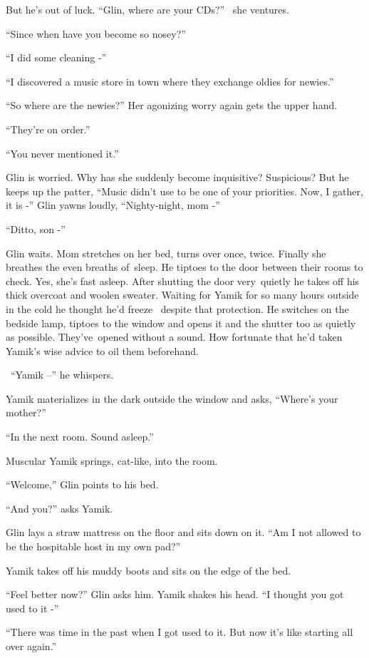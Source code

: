 \documentclass[twoside,11pt]{book}
\begin{document}
But he's out of luck. ``Glin, where are your CDs?'' \ she ventures.

``Since when have you become so nosey?''

``I did some cleaning -''

``I discovered a music store in town where they exchange oldies for newies.''

``So where are the newies?'' Her agonizing worry again gets the upper hand.

``They're on order.''

``You never mentioned it.''

Glin is worried. Why has she suddenly become inquisitive? Suspicious? But he keeps up the patter, ``Music
didn't use to be one of your priorities. Now, I gather, it is -'' Glin yawns
loudly{,} ``Nighty-night, mom -''

``Ditto, son -''

Glin waits. Mom stretches on her bed, turns over once, twice. Finally she breathes the even breaths of~sleep. He tiptoes
to the door between their rooms to check. Yes, she's fast asleep. After shutting the door very~quietly he takes off his
thick overcoat and woolen sweater. Waiting for Yamik for so many hours outside in the cold he thought he'd freeze
\ despite that protection. He switches on the bedside lamp, tiptoes to the window and opens it and the shutter too as
quietly as possible. They've~opened without a sound. How fortunate that
h{e}{}'d taken{ }Yamik's wise advice to
oil them beforehand.

\ ``Yamik --'' he whispers.

Yamik materializes in the dark outside the window and asks, ``Where's your mother?''

``In the next room. Sound asleep.''

Muscular Yamik springs, cat-like, into the room.

``Welcome,'' Glin points to his bed.

``And you?'' asks Yamik.~

Glin lays a straw mattress on the floor and sits down on it. ``Am I not allowed to be the hospitable host
in my own pad?''

Yamik takes off his muddy boots and sits on the edge of the bed.

``Feel better now?'' Glin asks him. Yamik shakes his
head.{ }``I thought you got used to it -''

``There was time in the past when I got used to it. But now it's like starting all over
again.''
\end{document}
